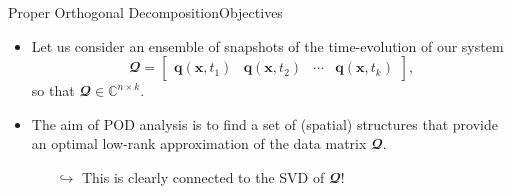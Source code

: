 \documentclass[usenames,dvipsnames,svgnames,10pt,aspectratio=169]{beamer}
\begin{document}
\begin{frame}[t, c]{Proper Orthogonal Decomposition}{Objectives}
	\begin{itemize}
		\item Let us consider an ensemble of snapshots of the time-evolution of our system
		$$\mathbfcal{Q} = \begin{bmatrix} \mathbf{q}(\bm{x}, t_1) & \mathbf{q}(\bm{x}, t_2) & \cdots & \mathbf{q}(\bm{x}, t_k) \end{bmatrix},$$
		so that $\mathbfcal{Q} \in \mathbb{C}^{n \times k}$.

		\bigskip

		\item The aim of POD analysis is to find a set of (spatial) structures that provide an optimal low-rank approximation of the data matrix $\mathbfcal{Q}$.
		\begin{itemize}
			\item[$\hookrightarrow$] This is clearly connected to the SVD of $\mathbfcal{Q}$!
		\end{itemize}
	\end{itemize}

	\vspace{1cm}
\end{frame}
\end{document}
